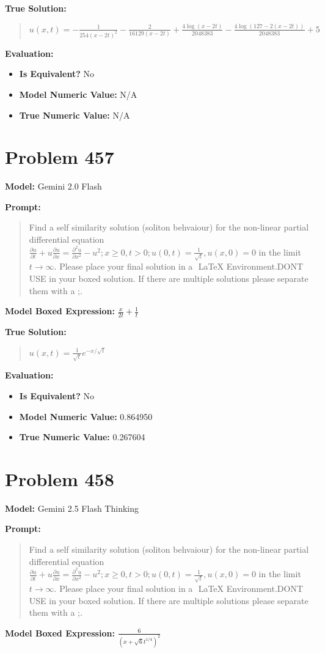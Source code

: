 \documentclass{article}
\begin{document}
\textbf{True Solution:}
\begin{quote}
$u(x,t)=-\frac{1}{254 (x-2t)^2}-\frac{2}{16129 (x-2t)}+\frac{4 \log (x-2t)}{2048383}-\frac{4 \log (127-2 (x-2t))}{2048383}+5$
\end{quote}

\textbf{Evaluation:}
\begin{itemize}
\item \textbf{Is Equivalent?} No
\item \textbf{Model Numeric Value:} N/A
\item \textbf{True Numeric Value:} N/A
\end{itemize}
\vspace{1cm}
\section*{Problem 457}
\textbf{Model:} Gemini 2.0 Flash

\textbf{Prompt:}
\begin{quote}
Find a self similarity solution (soliton behvaiour) for the non-linear partial differential equation $\frac{\partial u}{\partial t} + u \frac{\partial u}{\partial x} = \frac{\partial^2 u}{\partial x^2} - u^2; x \geq 0, t > 0; u(0, t) = \frac{1}{\sqrt{t}}, u(x,0) = 0$ in the limit $t \rightarrow \infty$. Please place your final solution in a $\boxed{}$ LaTeX Environment.DONT USE \operatorname in your boxed solution. If there are multiple solutions please separate them with a ;.
\end{quote}
\textbf{Model Boxed Expression:} $\frac{x}{2t} + \frac{1}{t}$

\textbf{True Solution:}
\begin{quote}
$u(x,t) = \frac{1}{\sqrt{t}} e^{-x/\sqrt{t}}$
\end{quote}

\textbf{Evaluation:}
\begin{itemize}
\item \textbf{Is Equivalent?} No
\item \textbf{Model Numeric Value:} 0.864950
\item \textbf{True Numeric Value:} 0.267604
\end{itemize}
\vspace{1cm}
\section*{Problem 458}
\textbf{Model:} Gemini 2.5 Flash Thinking

\textbf{Prompt:}
\begin{quote}
Find a self similarity solution (soliton behvaiour) for the non-linear partial differential equation $\frac{\partial u}{\partial t} + u \frac{\partial u}{\partial x} = \frac{\partial^2 u}{\partial x^2} - u^2; x \geq 0, t > 0; u(0, t) = \frac{1}{\sqrt{t}}, u(x,0) = 0$ in the limit $t \rightarrow \infty$. Please place your final solution in a $\boxed{}$ LaTeX Environment.DONT USE \operatorname in your boxed solution. If there are multiple solutions please separate them with a ;.
\end{quote}
\textbf{Model Boxed Expression:} $\frac{6}{(x + \sqrt{6} t^{1/4})^2}$
\end{document}

